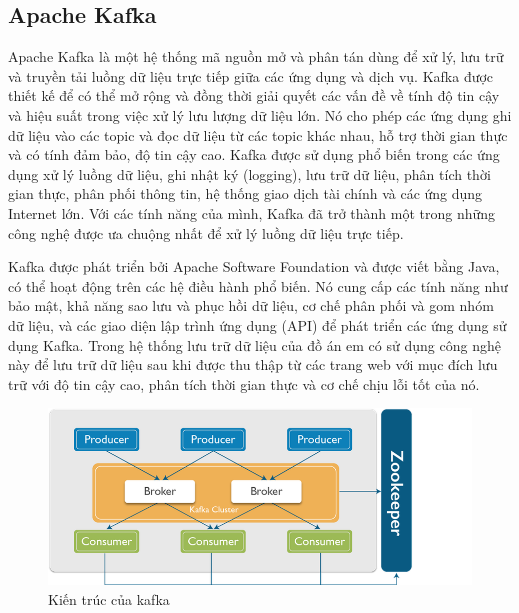 \documentclass[../DoAn.tex]{subfiles}
\begin{document}
\subsection{Apache Kafka}
\label{subsection:3.2.1}
Apache Kafka là một hệ thống mã nguồn mở và phân tán dùng để xử lý, lưu trữ và truyền tải luồng dữ liệu trực tiếp giữa các ứng dụng và dịch vụ. Kafka được thiết kế để có thể mở rộng và đồng thời giải quyết các vấn đề về tính độ tin cậy và hiệu suất trong việc xử lý lưu lượng dữ liệu lớn. Nó cho phép các ứng dụng ghi dữ liệu vào các topic và đọc dữ liệu từ các topic khác nhau, hỗ trợ thời gian thực và có tính đảm bảo, độ tin cậy cao. Kafka được sử dụng phổ biến trong các ứng dụng xử lý luồng dữ liệu, ghi nhật ký (logging), lưu trữ dữ liệu, phân tích thời gian thực, phân phối thông tin, hệ thống giao dịch tài chính và các ứng dụng Internet lớn. Với các tính năng của mình, Kafka đã trở thành một trong những công nghệ được ưa chuộng nhất để xử lý luồng dữ liệu trực tiếp.

Kafka được phát triển bởi Apache Software Foundation và được viết bằng Java, có thể hoạt động trên các hệ điều hành phổ biến. Nó cung cấp các tính năng như bảo mật, khả năng sao lưu và phục hồi dữ liệu, cơ chế phân phối và gom nhóm dữ liệu, và các giao diện lập trình ứng dụng (API) để phát triển các ứng dụng sử dụng Kafka. Trong hệ thống lưu trữ dữ liệu của đồ án em có sử dụng công nghệ này để lưu trữ dữ liệu sau khi được thu thập từ các trang web với mục đích lưu trữ với độ tin cậy cao, phân tích thời gian thực và cơ chế chịu lỗi tốt của nó.

\begin{figure}[H]
    \centering
    \includegraphics[scale=1.25]{Hinhve/kafka_architecture.png}
    \caption{Kiến trúc của kafka}
    \label{fig:my_label2}
\end{figure}
\end{document}
